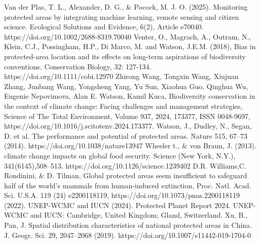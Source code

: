 \documentclass[12pt]{article}
\theoremstyle{break} %
\begin{document}
\newline \newline
Van der Plas, T. L., Alexander, D. G., \& Pocock, M. J. O. (2025). Monitoring protected areas by integrating machine learning, remote sensing and citizen science. Ecological Solutions and Evidence, 6(2), Article e70040. https://doi.org/10.1002/2688-8319.70040
\newline \newline
Venter, O., Magrach, A., Outram, N., Klein, C.J., Possingham, H.P., Di Marco, M. and Watson, J.E.M. (2018), Bias in protected-area location and its effects on long-term aspirations of biodiversity conventions. Conservation Biology, 32: 127-134. https://doi.org/10.1111/cobi.12970
\newline \newline
Zhirong Wang, Tongxin Wang, Xiujuan Zhang, Junbang Wang, Yongsheng Yang, Yu Sun, Xiaohua Guo, Qinghua Wu, Eugenie Nepovimova, Alan E. Watson, Kamil Kuca, Biodiversity conservation in the context of climate change: Facing challenges and management strategies, Science of The Total Environment, Volume 937, 2024, 173377, ISSN 0048-9697, https://doi.org/10.1016/j.scitotenv.2024.173377.
\newline \newline
Watson, J., Dudley, N., Segan, D. et al. The performance and potential of protected areas. Nature 515, 67–73 (2014). https://doi.org/10.1038/nature13947
\newline \newline
Wheeler t., \& von Braun, J. (2013). climate change impacts on global food security. Science (New York, N.Y.), 341(6145),508–513. https://doi.org/10.1126/science.1239402
\newline \newline
D.R. Williams,C. Rondinini, \& D. Tilman,  Global protected areas seem insufficient to safeguard half of the world's mammals from human-induced extinction, Proc. Natl. Acad. Sci. U.S.A. 119 (24) e2200118119, https://doi.org/10.1073/pnas.2200118119 (2022).
\newline \newline
UNEP-WCMC and IUCN (2024). Protected Planet Report 2024. UNEP-WCMC and IUCN: Cambridge, United Kingdom; Gland, Switzerland.
\newline \newline
Xu, B., Pan, J. Spatial distribution characteristics of national protected areas in China. J. Geogr. Sci. 29, 2047–2068 (2019). https://doi.org/10.1007/s11442-019-1704-0
\newline \newline
\end{document}
